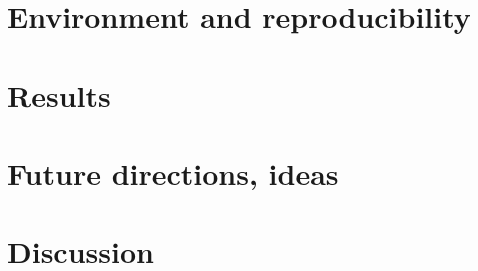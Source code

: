 \documentclass[fleqn,moreauthors,10pt]{ds_report}
\begin{document}
\section*{Environment and reproducibility}

\section*{Results}

\section*{Future directions, ideas}

\section*{Discussion}

% 


\end{document}
